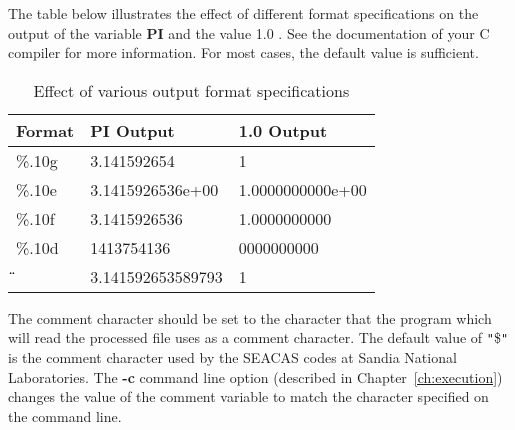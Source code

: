 The table below illustrates the effect of different format
specifications on the output of the variable \textbf{PI} and the value
1.0 . See the documentation of your C compiler for more
information. For most cases, the default value is sufficient.

\begin{longtable}{lll}
\caption{Effect of various output format specifications}\\
Format & PI Output & 1.0 Output \\
\hline
\%.10g &  3.141592654      & 1  \\
\%.10e &  3.1415926536e+00 & 1.0000000000e+00  \\
\%.10f &  3.1415926536     & 1.0000000000  \\
\%.10d &  1413754136       & 0000000000  \\
\"\"   &  3.141592653589793 & 1 \\
\end{longtable}

The comment character should be set to the character that the program
which will read the processed file uses as a comment character. The
default value of \texttt{"}\$\texttt{"} is the comment character used
by the SEACAS codes at Sandia National Laboratories.  The \textbf{-c}
command line option (described in Chapter~\ref{ch:execution}) changes
the value of the comment variable to match the character specified on
the command line.
